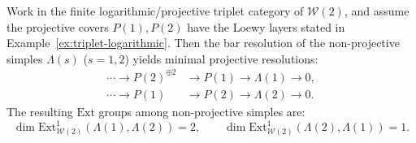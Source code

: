 \begin{proposition}
\label{prop:w2-ext-bar}
Work in the finite logarithmic/projective triplet category of
$\mathcal W(2)$, and assume the projective covers $P(1),P(2)$ have
the Loewy layers stated in Example~\ref{ex:triplet-logarithmic}.
Then the bar resolution of the non-projective simples $\Lambda(s)$
\textup{($s = 1,2$)} yields minimal projective resolutions:
\begin{align}
\label{eq:w2-resolution-1}
\cdots \to P(2)^{\oplus 2} &\to P(1) \to \Lambda(1) \to 0, \\
\label{eq:w2-resolution-2}
\cdots \to P(1) &\to P(2) \to \Lambda(2) \to 0.
\end{align}
The resulting $\mathrm{Ext}$ groups among non-projective simples are:
\begin{equation}\label{eq:w2-ext}
\dim \mathrm{Ext}^1_{\mathcal{W}(2)}(\Lambda(1), \Lambda(2)) = 2,
\qquad
\dim \mathrm{Ext}^1_{\mathcal{W}(2)}(\Lambda(2), \Lambda(1)) = 1.
\end{equation}
\end{proposition}

